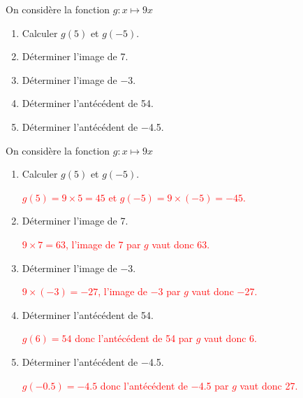 \begin{exercice*}
    On considère la fonction $g:x\longmapsto 9x$
    \begin{enumerate}
        \item Calculer $g(5)$ et $g(-5)$.
        \item Déterminer l'image de \num{7}.
        \item Déterminer l'image de \num{-3}.
        \item Déterminer l'antécédent de \num{54}.
        \item Déterminer l'antécédent de \num{-4.5}.
    \end{enumerate}
\end{exercice*}
\begin{corrige}
    On considère la fonction $g:x\longmapsto 9x$
    \begin{enumerate}
        \item Calculer $g(5)$ et $g(-5)$.
        
        \textcolor{red}{$g(5)=9\times 5 = 45$ et $g(-5)=9\times (-5)=-45$.}
        \item Déterminer l'image de \num{7}.
        
        \textcolor{red}{$9\times 7=63$, l'image de 7 par $g$ vaut donc 63.}
        \item Déterminer l'image de \num{-3}.
        
        \textcolor{red}{$9\times (-3)=-27$, l'image de \num{-3} par $g$ vaut donc \num{-27}.}
        \item Déterminer l'antécédent de \num{54}.
        
        \textcolor{red}{$g(6)=54$ donc l'antécédent de \num{54} par $g$ vaut donc \num{6}.}
        \item Déterminer l'antécédent de \num{-4.5}.
        
        \textcolor{red}{$g(\num{-0.5})=\num{-4.5}$ donc l'antécédent de \num{-4.5} par $g$ vaut donc \num{27}.}
    \end{enumerate}
\end{corrige}
